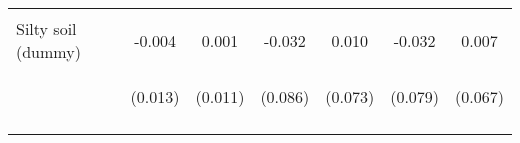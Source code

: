 \begin{center}
\begin{tabular}{lcccccc}
\vspace{4pt} & \begin{footnotesize}[0.526]\end{footnotesize} & \begin{footnotesize}[0.486]\end{footnotesize} & \begin{footnotesize}[0.448]\end{footnotesize} & \begin{footnotesize}[0.503]\end{footnotesize} & \begin{footnotesize}[0.449]\end{footnotesize} & \begin{footnotesize}[0.507]\end{footnotesize} \\
Silty soil (dummy) & -0.004 & 0.001 & -0.032 & 0.010 & -0.032 & 0.007 \\
 & \begin{footnotesize}(0.013)\end{footnotesize} & \begin{footnotesize}(0.011)\end{footnotesize} & \begin{footnotesize}(0.086)\end{footnotesize} & \begin{footnotesize}(0.073)\end{footnotesize} & \begin{footnotesize}(0.079)\end{footnotesize} & \begin{footnotesize}(0.067)\end{footnotesize} \\
\vspace{4pt} & \begin{footnotesize}[0.735]\end{footnotesize} & \begin{footnotesize}[0.899]\end{footnotesize} & \begin{footnotesize}[0.715]\end{footnotesize} & \begin{footnotesize}[0.892]\end{footnotesize} & \begin{footnotesize}[0.684]\end{footnotesize} & \begin{footnotesize}[0.915]\end{footnotesize} \\

\end{tabular}
\end{center}
